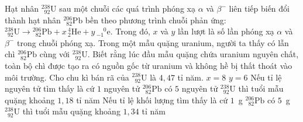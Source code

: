 	\begin{ex}%
		Hạt nhân $^{238}_{\phantom{2}92}\text{U}$ sau một chuỗi các quá trình phóng xạ $\alpha$ và $\beta^-$ liên tiếp biến đổi thành hạt nhân $^{206}_{\phantom{2}82}\text{Pb}$ bền theo phương trình chuỗi phản ứng: $^{238}_{\phantom{2}92}\text{U}\to{}^{206}_{\phantom{2}82}\text{Pb}+x\,{}^4_2\text{He}+y\,{}^{\phantom{-}0}_{-1}\text{e}$. Trong đó, $x$ và $y$ lần lượt là số lần phóng xạ $\alpha$ và $\beta^-$ trong chuỗi phóng xạ. Trong một mẫu quặng uranium, người ta thấy có lẫn chì $^{206}_{\phantom{2}82}\text{Pb}$ cùng với $^{238}_{\phantom{2}92}\text{U}$. Biết rằng lúc đầu mẫu quặng chứa uranium nguyên chất, toàn bộ chì được tạo ra có nguồn gốc từ uranium và không hề bị thất thoát vào môi trường. Cho chu kì bán rã của $^{238}_{\phantom{2}92}\text{U}$ là $4{,}47$ tỉ năm.
		\choiceTFt
		{\True $x=8$}
		{\True $y=6$}
		{\True Nếu tỉ lệ nguyên tử tìm thấy là cứ $1$ nguyên tử $^{206}_{\phantom{2}82}\text{Pb}$ có $5$ nguyên tử $^{238}_{\phantom{2}92}\text{U}$ thì tuổi mẫu quặng khoảng $1{,}18$ tỉ năm}
		{\True Nếu tỉ lệ khối lượng tìm thấy là cứ $1$~g $^{206}_{\phantom{2}82}\text{Pb}$ có $5$~g $^{238}_{\phantom{2}92}\text{U}$ thì tuổi mẫu quặng khoảng $1{,}34$ tỉ năm}
	\end{ex}

